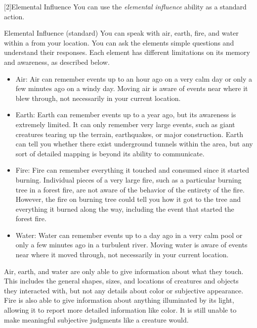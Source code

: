         [2]{Elemental Influence} You can use the \textit{elemental influence} ability as a standard action.
        \begin{durationability}{Elemental Influence}
             (standard)
            \rankline
            You can speak with air, earth, fire, and water within a \areahuge {} from your location.
            You can ask the elements simple questions and understand their responses.
            Each element has different limitations on its memory and awareness, as described below.

            \begin{itemize}
                \item Air: Air can remember events up to an hour ago on a very calm day or only a few minutes ago on a windy day.
                    Moving air is aware of events near where it blew through, not necessarily in your current location.
                \item Earth: Earth can remember events up to a year ago, but its awareness is extremely limited.
                    It can only remember very large events, such as giant creatures tearing up the terrain, earthquakes, or major construction.
                    Earth can tell you whether there exist underground tunnels within the area, but any sort of detailed mapping is beyond its ability to communicate.
                \item Fire: Fire can remember everything it touched and consumed since it started burning.
                    Individual pieces of a very large fire, such as a particular burning tree in a forest fire, are not aware of the behavior of the entirety of the fire.
                    However, the fire on burning tree could tell you how it got to the tree and everything it burned along the way, including the event that started the forest fire.
                \item Water: Water can remember events up to a day ago in a very calm pool or only a few minutes ago in a turbulent river.
                    Moving water is aware of events near where it moved through, not necessarily in your current location.
            \end{itemize}

            Air, earth, and water are only able to give information about what they touch.
            This includes the general shapes, sizes, and locations of creatures and objects they interacted with, but not any details about color or subjective appearance.
            Fire is also able to give information about anything illuminated by its light, allowing it to report more detailed information like color.
            It is still unable to make meaningful subjective judgments like a creature would.
        \end{durationability}

